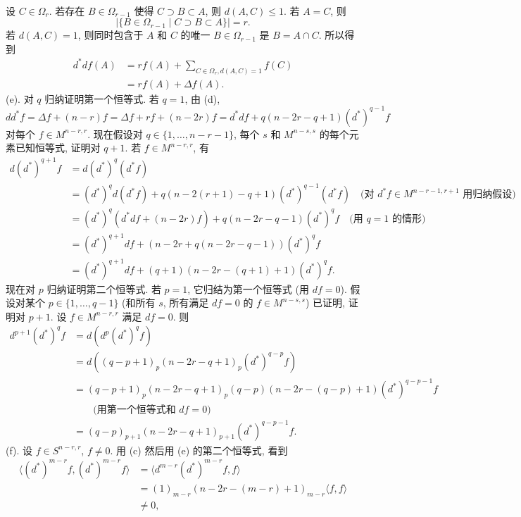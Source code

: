 \begin{solution}
\begin{align*}
\end{align*}
设 $C \in \Omega_r$. 若存在 $B \in \Omega_{r-1}$ 使得 $C \supset B \subset A$, 则 $d(A, C) \leq 1$. 若 $A = C$, 则
\[
|\{B \in \Omega_{r-1} \mid C \supset B \subset A\}| = r.
\]
若 $d(A, C) = 1$, 则同时包含于 $A$ 和 $C$ 的唯一 $B \in \Omega_{r-1}$ 是 $B = A \cap C$. 所以得到
\begin{align*}
d^*df(A) &= rf(A) + \sum_{C \in \Omega_r, d(A,C)=1}f(C) \\
&= rf(A) + \Delta f(A).
\end{align*}
(e). 对 $q$ 归纳证明第一个恒等式. 若 $q = 1$, 由 (d),
\[
dd^*f = \Delta f + (n-r)f = \Delta f + rf + (n-2r)f = d^*df + q(n-2r-q+1)(d^*)^{q-1}f
\]
对每个 $f \in M^{n-r,r}$. 现在假设对 $q \in \{1, \ldots, n-r-1\}$, 每个 $s$ 和 $M^{n-s,s}$ 的每个元素已知恒等式, 证明对 $q+1$. 若 $f \in M^{n-r,r}$, 有
\begin{align*}
d(d^*)^{q+1}f &= d(d^*)^q(d^*f) \\
&= (d^*)^qd(d^*f) + q(n-2(r+1)-q+1)(d^*)^{q-1}(d^*f) \quad \text{(对 } d^*f \in M^{n-r-1,r+1} \text{ 用归纳假设)} \\
&= (d^*)^q(d^*df + (n-2r)f) + q(n-2r-q-1)(d^*)^qf \quad \text{(用 } q=1 \text{ 的情形)} \\
&= (d^*)^{q+1}df + (n-2r + q(n-2r-q-1))(d^*)^qf \\
&= (d^*)^{q+1}df + (q+1)(n-2r-(q+1)+1)(d^*)^qf.
\end{align*}
现在对 $p$ 归纳证明第二个恒等式. 若 $p = 1$, 它归结为第一个恒等式 (用 $df = 0$). 假设对某个 $p \in \{1, \ldots, q-1\}$ (和所有 $s$, 所有满足 $df = 0$ 的 $f \in M^{n-s,s}$) 已证明, 证明对 $p+1$. 设 $f \in M^{n-r,r}$ 满足 $df = 0$. 则
\begin{align*}
d^{p+1}(d^*)^qf &= d(d^p(d^*)^qf) \\
&= d((q-p+1)_p(n-2r-q+1)_p(d^*)^{q-p}f) \\
&= (q-p+1)_p(n-2r-q+1)_p(q-p)(n-2r-(q-p)+1)(d^*)^{q-p-1}f \\
&\qquad \text{(用第一个恒等式和 } df = 0\text{)} \\
&= (q-p)_{p+1}(n-2r-q+1)_{p+1}(d^*)^{q-p-1}f.
\end{align*}
(f). 设 $f \in S^{n-r,r}$, $f \neq 0$. 用 (c) 然后用 (e) 的第二个恒等式, 看到
\begin{align*}
\langle (d^*)^{m-r}f, (d^*)^{m-r}f \rangle &= \langle d^{m-r}(d^*)^{m-r}f, f \rangle \\
&= (1)_{m-r}(n-2r-(m-r)+1)_{m-r}\langle f, f \rangle \\
&\neq 0,
\end{align*}

\end{solution}
